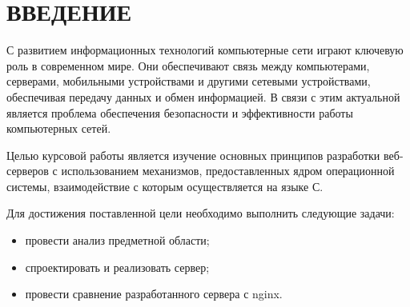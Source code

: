 \chapter*{ВВЕДЕНИЕ}

С развитием информационных технологий компьютерные сети играют ключевую роль в современном мире. Они обеспечивают связь между компьютерами, серверами, мобильными устройствами и другими сетевыми устройствами, обеспечивая передачу данных и обмен информацией. В связи с этим актуальной является проблема обеспечения безопасности и эффективности работы компьютерных сетей.

Целью курсовой работы является изучение основных принципов разработки веб-серверов с использованием механизмов, предоставленных ядром операционной системы, взаимодействие с которым осуществляется на языке С.

Для достижения поставленной цели необходимо выполнить следующие задачи:

\begin{itemize}[label=---]
    \item провести анализ предметной области;
    \item спроектировать и реализовать сервер;
    \item провести сравнение разработанного сервера с nginx.
\end{itemize}